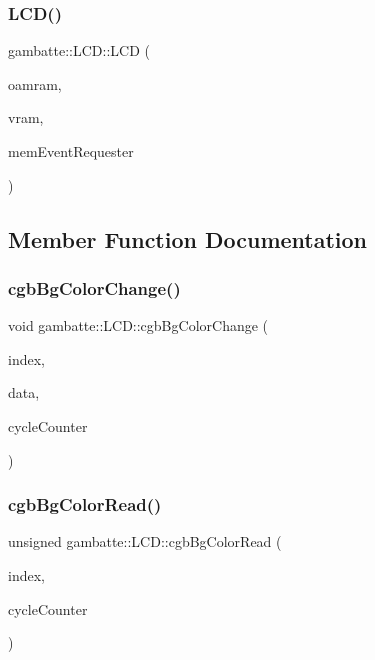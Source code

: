 \subsubsection{\texorpdfstring{L\+C\+D()}{LCD()}}
{\footnotesize\ttfamily gambatte\+::\+L\+C\+D\+::\+L\+CD (\begin{DoxyParamCaption}\item[{unsigned char const $\ast$}]{oamram,  }\item[{unsigned char const $\ast$}]{vram,  }\item[{\hyperlink{classgambatte_1_1VideoInterruptRequester}{Video\+Interrupt\+Requester}}]{mem\+Event\+Requester }\end{DoxyParamCaption})}



\subsection{Member Function Documentation}
\mbox{\label{classgambatte_1_1LCD_a27150bfc8eab3ebf11dbba1282732517}} 
\subsubsection{\texorpdfstring{cgb\+Bg\+Color\+Change()}{cgbBgColorChange()}}
{\footnotesize\ttfamily void gambatte\+::\+L\+C\+D\+::cgb\+Bg\+Color\+Change (\begin{DoxyParamCaption}\item[{unsigned}]{index,  }\item[{unsigned}]{data,  }\item[{unsigned}]{cycle\+Counter }\end{DoxyParamCaption})\hspace{0.3cm}{\ttfamily [inline]}}

\mbox{\label{classgambatte_1_1LCD_ae59d87cfa4dbe74cb59678fc2ebe2cc6}} 
\subsubsection{\texorpdfstring{cgb\+Bg\+Color\+Read()}{cgbBgColorRead()}}
{\footnotesize\ttfamily unsigned gambatte\+::\+L\+C\+D\+::cgb\+Bg\+Color\+Read (\begin{DoxyParamCaption}\item[{unsigned}]{index,  }\item[{unsigned}]{cycle\+Counter }\end{DoxyParamCaption})\hspace{0.3cm}{\ttfamily [inline]}}


